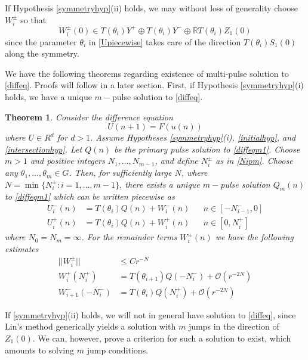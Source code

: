 \documentclass[12pt]{article}
\def\R{{\mathbb R}}
\newtheorem{theorem}{Theorem}
\begin{document}
If Hypothesis \ref{symmetryhyp}(ii) holds, we may without loss of generality choose $W_i^\pm$ so that 
\begin{equation}\label{W0loc}
W_i^\pm(0) \in T(\theta_i) Y^+ \oplus T(\theta_i) Y^- \oplus \R T(\theta_i) Z_1(0)
\end{equation}
since the parameter $\theta_i$ in \eqref{Upiecewise} takes care of the direction $T(\theta_i) S_1(0)$ along the symmetry.

We have the following theorems regarding existence of multi-pulse solution to \eqref{diffeq}. Proofs will follow in a later section. First, if Hypothesis \ref{symmetryhyp}(i) holds, we have a unique $m-$pulse solution to \eqref{diffeq}.

\begin{theorem}\label{transversemulti}
Consider the difference equation
\begin{equation}\label{diffeqm1}
U(n+1) = F(u(n))
\end{equation}
where $U \in R^d$ for $d > 1$. Assume Hypotheses \ref{symmetryhyp}(i), \ref{initialhyp}, and \ref{intersectionhyp}. Let $Q(n)$ be the primary pulse solution to \eqref{diffeqm1}. Choose $m > 1$ and positive integers $N_1, \dots, N_{m-1}$, and define $N_i^\pm$ as in \eqref{Nipm}. Choose any $\theta_1, \dots, \theta_m \in G$. Then, for sufficiently large $N$, where $N = \min\{ N_i^\pm : i = 1, \dots, m-1 \}$, there exists a unique $m-$pulse solution $Q_m(n)$ to \eqref{diffeqm1} which can be written piecewise as 
\begin{align}
U_i^-(n) &= T(\theta_i) Q(n) + W_i^-(n) && n \in [-N_{i-1}^-, 0] \\
U_i^+(n) &= T(\theta_i) Q(n) + W_i^+(n) && n \in [0, N_i^+]
\end{align}
where $N_0 = N_m = \infty$. For the remainder terms $W_i^\pm(n)$ we have the following estimates
\begin{equation}\label{Westimates}
\begin{aligned}
||W_i^\pm|| &\leq C r^{-N} \\
W_i^+(N_i^+) &= T(\theta_{i+1}) Q(-N_i^-) + \mathcal{O}(r^{-2N}) \\
W_{i+1}^-(-N_i^-) &= T(\theta_i) Q(N_i^+) + \mathcal{O}(r^{-2N})
\end{aligned}
\end{equation}
\end{theorem}

If \ref{symmetryhyp}(ii) holds, we will not in general have solution to \eqref{diffeq}, since Lin's method generically yields a solution with $m$ jumps in the direction of $Z_1(0)$. We can, however, prove a criterion for such a solution to exist, which amounts to solving $m$ jump conditions.
\end{document}
